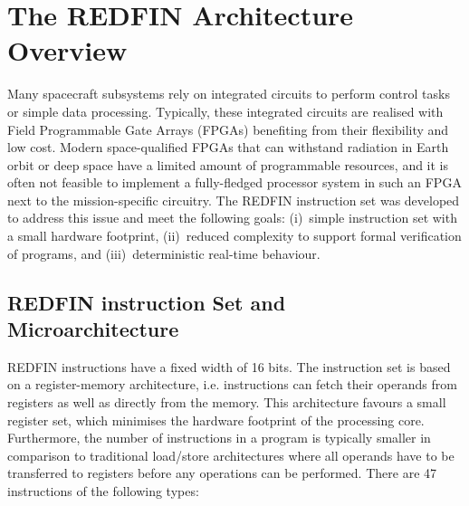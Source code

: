 \section{The REDFIN Architecture Overview\label{sec-redfin}}

Many spacecraft subsystems rely on integrated circuits to perform control tasks
or simple data processing. Typically, these integrated circuits are realised
with Field Programmable Gate Arrays (FPGAs) benefiting from their flexibility
and low cost. Modern space-qualified FPGAs that can withstand radiation in Earth
orbit or deep space have a limited amount of programmable resources, and it is
often not feasible to implement a fully-fledged processor system in such an FPGA
next to the mission-specific circuitry.
The REDFIN instruction set was developed to address this issue and meet the
following goals: (i)~simple instruction set with a small hardware footprint,
(ii)~reduced complexity to support formal verification of programs, and
(iii)~deterministic real-time behaviour.

\subsection{REDFIN instruction Set and Microarchitecture}

REDFIN instructions have a fixed width of 16 bits.
The instruction set is based on a register-memory architecture, i.e.
instructions can fetch their operands from registers as well as directly from the
memory. This architecture favours a small register set, which minimises the hardware
footprint of the processing core. Furthermore, the number of instructions in a
program is typically smaller in comparison to traditional load/store architectures
where all operands have to be transferred to registers before any operations can
be performed. There are 47 instructions of the following types:

